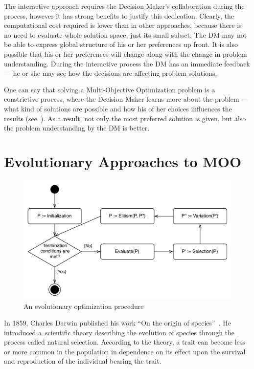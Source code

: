 The interactive approach requires the Decision Maker's collaboration during
the process, however it has strong benefits to justify this
dedication. Clearly, the computational cost required is lower than in other
approaches, because there is no need to evaluate whole solution space, just
its small subset. The DM may not be able to express global structure of his or
her preferences up front. It is also possible that his or her preferences will
change along with the change in problem understanding. During the interactive
process the DM has an immediate feedback --- he or she may see how the
decisions are affecting problem solutions.

One can say that solving a Multi-Objective Optimization problem is a
constrictive process, where the Decision Maker learns more about the problem
--- what kind of solutions are possible and how his of her choices influences
the results (see~\cite{MRW08}). As a result, not only the most preferred
solution is given, but also the problem understanding by the DM is better.


\section{Evolutionary Approaches to MOO}
\label{sec_ea_in_moo}

\begin{figure}
  \centering \includegraphics[scale=0.65]{img/eo}
  \caption{An evolutionary optimization procedure}
  \label{eo}
\end{figure}

In 1859, Charles Darwin published his work ``On the origin of
species''~\cite{Dar1859}. He introduced a~scientific theory describing the
evolution of species through the process called natural selection.  According
to the theory, a trait can become less or more common in the population in
dependence on its effect upon the survival and reproduction of the individual
bearing the trait.

